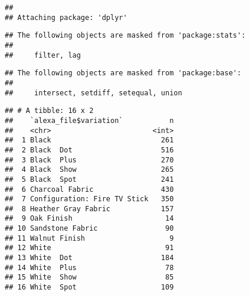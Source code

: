 \documentclass[
]{article}
\newenvironment{Shaded}{\begin{snugshade}}{\end{snugshade}}
\newcommand{\AttributeTok}[1]{\textcolor[rgb]{0.13,0.29,0.53}{#1}}
\newcommand{\DocumentationTok}[1]{\textcolor[rgb]{0.56,0.35,0.01}{\textbf{\textit{#1}}}}
\newcommand{\FunctionTok}[1]{\textcolor[rgb]{0.13,0.29,0.53}{\textbf{#1}}}
\newcommand{\NormalTok}[1]{#1}
\newcommand{\OtherTok}[1]{\textcolor[rgb]{0.56,0.35,0.01}{#1}}
\newcommand{\SpecialCharTok}[1]{\textcolor[rgb]{0.81,0.36,0.00}{\textbf{#1}}}
\newcommand{\StringTok}[1]{\textcolor[rgb]{0.31,0.60,0.02}{#1}}
\begin{document}
\begin{verbatim}
## 
## Attaching package: 'dplyr'
\end{verbatim}

\begin{verbatim}
## The following objects are masked from 'package:stats':
## 
##     filter, lag
\end{verbatim}

\begin{verbatim}
## The following objects are masked from 'package:base':
## 
##     intersect, setdiff, setequal, union
\end{verbatim}

\begin{Shaded}
\end{Shaded}

\begin{verbatim}
## # A tibble: 16 x 2
##    `alexa_file$variation`           n
##    <chr>                        <int>
##  1 Black                          261
##  2 Black  Dot                     516
##  3 Black  Plus                    270
##  4 Black  Show                    265
##  5 Black  Spot                    241
##  6 Charcoal Fabric                430
##  7 Configuration: Fire TV Stick   350
##  8 Heather Gray Fabric            157
##  9 Oak Finish                      14
## 10 Sandstone Fabric                90
## 11 Walnut Finish                    9
## 12 White                           91
## 13 White  Dot                     184
## 14 White  Plus                     78
## 15 White  Show                     85
## 16 White  Spot                    109
\end{verbatim}
\end{document}
